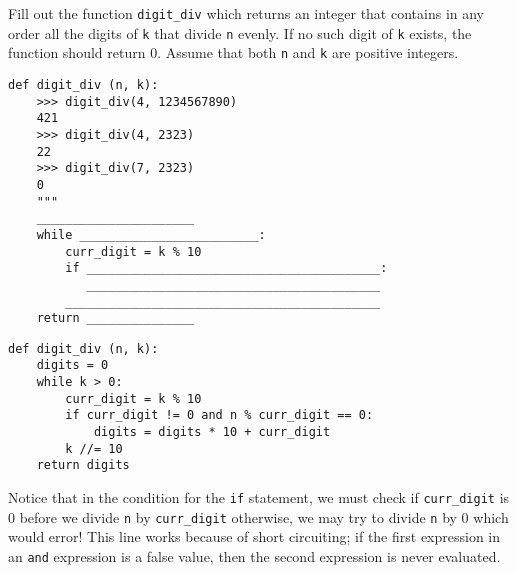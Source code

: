 \question Fill out the function \lstinline{digit_div} which returns an integer that contains in any order all the digits of \lstinline{k} that divide \lstinline{n} evenly. If no such digit of \lstinline{k} exists, the function should return 0. Assume that both \lstinline{n} and \lstinline{k} are positive integers.

\begin{blocksection}
\begin{lstlisting}
def digit_div (n, k):
    >>> digit_div(4, 1234567890)
    421
    >>> digit_div(4, 2323)
    22
    >>> digit_div(7, 2323)
    0
    """
    ______________________
    while _________________________:
        curr_digit = k % 10
        if _________________________________________:
           _________________________________________
        ____________________________________________
    return _______________
\end{lstlisting}
\end{blocksection}

\begin{blocksection}
\begin{solution}[0in]
\begin{lstlisting}
def digit_div (n, k):
    digits = 0
    while k > 0:
        curr_digit = k % 10
        if curr_digit != 0 and n % curr_digit == 0:
            digits = digits * 10 + curr_digit
        k //= 10
    return digits
\end{lstlisting}
Notice that in the condition for the \lstinline{if} statement, we must check if \lstinline{curr_digit} is 0 before we divide \lstinline{n} by \lstinline{curr_digit} otherwise, we may try to divide \lstinline{n} by 0 which would error! This line works because of short circuiting; if the first expression in an \lstinline{and} expression is a false value, then the second expression is never evaluated.
\end{solution}
\end{blocksection}
